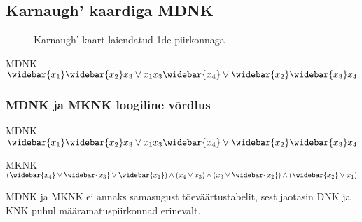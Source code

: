 \documentclass{article}
\begin{document}
\subsection{Karnaugh' kaardiga MDNK}




\begin{figure}[H]
\centering
\begin{Karnaugh}
\end{Karnaugh}
\caption{Karnaugh' kaart laiendatud 1de piirkonnaga}
\label{fig:karnaugh-piirkond1}
\end{figure}
MDNK $\widebar{x_1}\widebar{x_2}x_3 \lor x_1x_3\widebar{x_4} \lor \widebar{x_2}\widebar{x_3}x_4$

\subsubsection{MDNK ja MKNK loogiline võrdlus}
MDNK $\widebar{x_1}\widebar{x_2}x_3 \lor x_1x_3\widebar{x_4} \lor \widebar{x_2}\widebar{x_3}x_4$

MKNK $(\widebar{x_4} \lor \widebar{x_3} \lor \widebar{x_1}) \land (x_4 \lor x_3) \land (x_3 \lor \widebar{x_2}) \land (\widebar{x_2} \lor x_1)$

MDNK ja MKNK ei annaks samasugust tõeväärtustabelit, sest jaotasin DNK ja KNK puhul määramatuspiirkonnad erinevalt.
\end{document}
